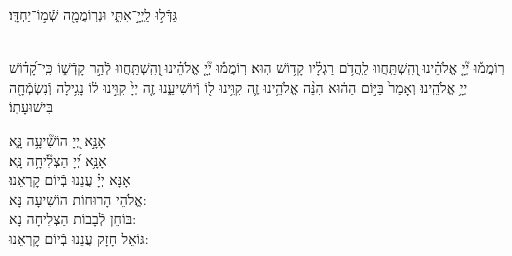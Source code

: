 \documentclass[twoside, openany, parskip=half, 11pt]{book}
\begin{document}
\shatz
גַּדְּֿל֣וּ לַֽיְיָ֣־אִתִּ֑י וּנְרֽוֹמֲמָ֖ה שְֿׁמ֣וֹ־יַחְדָּֽו׃

\\
רֽוֹמֲמ֡וּ יְ֘יָ֤ אֱלֹהֵ֗ינוּ ֖וְהִֽשְׁתַּֽחֲווּ לַֽהֲדֹ֥ם רַגְלָ֗יו קָד֥וֹשׁ הֽוּא׃
רֽוֹמֲמ֡וּ יְ֘יָ֤ אֱלֹהֵ֗ינוּ ֖וְהִֽשְׁתַּֽחֲווּ לְֿהַ֣ר קָדְֿשׁ֑וֹ כִּֽי־קָ֝ד֗וֹשׁ יְיָ֥ אֱלֹהֵֽינוּ׃
וְאָמַר֙ בַּיּ֣וֹם הַה֔וּא הִנֵּ֨ה אֱלֹהֵ֥ינוּ זֶ֛ה קִוִּ֥ינוּ ל֖וֹ וְֿיוֹשִׁיעֵ֑נוּ זֶ֤ה יְיָ֙ קִוִּ֣ינוּ ל֔וֹ נָגִ֥ילָה וְֿנִשְׂמְֿחָ֖ה בִּישׁוּעָתֽוֹ׃



אָנָּ֣א יְ֭יָ הוֹשִׁ֘יעָ֥ה נָּ֑א\\
אָנָּ֥א יְ֝יָ הַצְלִ֘יחָ֥ה נָּֽא׃\\
אָנָּא יְיָ֗ עֲנֵנוּ בְֿיוֹם קׇרְאֵנוּ׃\\

אֱלֹהֵי הָרוּחוֹת הוֹשִׁיעָה נָּא:\\ בּוֹחֵן לְֿבָבוֹת הַצְלִיחָה נָא:\\ גּוֹאֵל חָזָק עֲנֵנוּ בְֿיוֹם קׇרְאֵנוּ:


\end{document}
